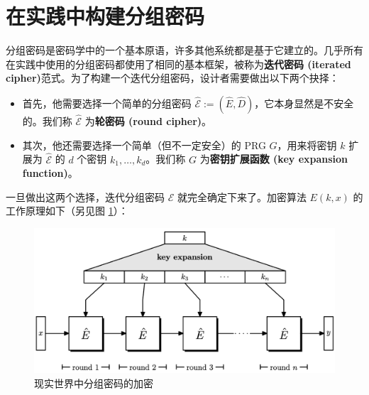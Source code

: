 \section{在实践中构建分组密码}

分组密码是密码学中的一个基本原语，许多其他系统都是基于它建立的。几乎所有在实践中使用的分组密码都使用了相同的基本框架，被称为\textbf{迭代密码 (iterated cipher)}范式。为了构建一个迭代分组密码，设计者需要做出以下两个抉择：
\begin{itemize}
	\item 首先，他需要选择一个简单的分组密码 $\mathcal{\hat E}:=(\hat E,\hat D)$，它本身显然是不安全的。我们称 $\mathcal{\hat E}$ 为\textbf{轮密码 (round cipher)}。
	\item 其次，他还需要选择一个简单（但不一定安全）的 PRG $G$，用来将密钥 $k$ 扩展为 $\mathcal{\hat E}$ 的 $d$ 个密钥 $k_1,\dots,k_d$。我们称 $G$ 为\textbf{密钥扩展函数 (key expansion function)}。
\end{itemize}
一旦做出这两个选择，迭代分组密码 $\mathcal{E}$ 就完全确定下来了。加密算法 $E(k,x)$ 的工作原理如下（另见图 \ref{fig:4-6}）：

\begin{figure}
  \centering
  \includegraphics[width=0.7\linewidth]{figures/chapter4/fig6.png}
  \caption{现实世界中分组密码的加密}
  \label{fig:4-6}
\end{figure}

